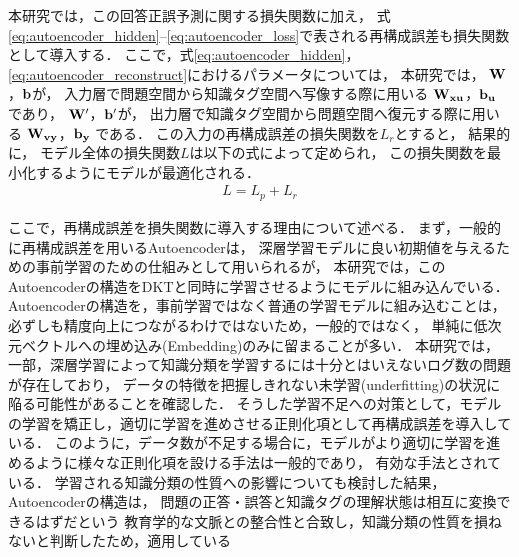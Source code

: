 本研究では，この回答正誤予測に関する損失関数に加え，
式\ref{eq:autoencoder_hidden}--\ref{eq:autoencoder_loss}で表される再構成誤差も損失関数として導入する．
ここで，式\ref{eq:autoencoder_hidden}，\ref{eq:autoencoder_reconstruct}におけるパラメータについては，
本研究では，
${\bf W}$，${\bf b}$が，
入力層で問題空間から知識タグ空間へ写像する際に用いる
${\bf W_{xu}}$，${\bf b_u}$
であり，
${\bf W'}$，${\bf b'}$が，
出力層で知識タグ空間から問題空間へ復元する際に用いる
${\bf W_{vy}}$，${\bf b_y}$
である．
この入力の再構成誤差の損失関数を$L_r$とすると，
結果的に，
モデル全体の損失関数$L$は以下の式によって定められ，
この損失関数を最小化するようにモデルが最適化される．
\begin{eqnarray}
\label{eq:total_loss}
{L = L_p + L_r}
\end{eqnarray}


ここで，再構成誤差を損失関数に導入する理由について述べる．
まず，一般的に再構成誤差を用いるAutoencoderは，
深層学習モデルに良い初期値を与えるための事前学習のための仕組みとして用いられるが，
本研究では，このAutoencoderの構造をDKTと同時に学習させるようにモデルに組み込んでいる．
Autoencoderの構造を，事前学習ではなく普通の学習モデルに組み込むことは，
必ずしも精度向上につながるわけではないため，一般的ではなく，
単純に低次元ベクトルへの埋め込み(Embedding)のみに留まることが多い．
本研究では，
一部，深層学習によって知識分類を学習するには十分とはいえないログ数の問題が存在しており，
データの特徴を把握しきれない未学習(underfitting)の状況に陥る可能性があることを確認した．
そうした学習不足への対策として，モデルの学習を矯正し，適切に学習を進めさせる正則化項として再構成誤差を導入している．
このように，データ数が不足する場合に，モデルがより適切に学習を進めるように様々な正則化項を設ける手法は一般的であり，
有効な手法とされている．
学習される知識分類の性質への影響についても検討した結果，
Autoencoderの構造は，
問題の正答・誤答と知識タグの理解状態は相互に変換できるはずだという
教育学的な文脈との整合性と合致し，知識分類の性質を損ねないと判断したため，適用している



%
%
%



